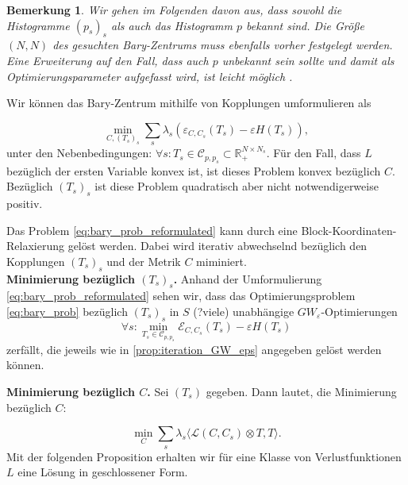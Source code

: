 \documentclass[twoside, 11pt,a4paper]{article}
\newtheorem{remark}[theorem]{Bemerkung}
\numberwithin{equation}{section}
\begin{document}
	\begin{remark}
		Wir gehen im Folgenden davon aus, dass sowohl die Histogramme $(p_s)_s$ als auch das Histogramm $p$ bekannt sind. Die Größe $(N,N)$ des gesuchten Bary-Zentrums muss ebenfalls vorher festgelegt werden.
		Eine Erweiterung auf den Fall, dass auch $p$ unbekannt sein sollte und damit als Optimierungsparameter aufgefasst wird, ist leicht möglich \cite{gwd_averaging_kernels}.
	\end{remark}
	
	Wir können das Bary-Zentrum mithilfe von Kopplungen umformulieren als
	
	\begin{equation}
	\min_{C,(T_s)_s}{\sum_s{\lambda_s(\varepsilon_{C,C_s}(T_s) - \varepsilon H(T_s))}}, \label{eq:bary_prob_reformulated} 
	\end{equation}
	unter den Nebenbedingungen: $ \forall s: T_s \in \mathcal{C}_{p,p_s} \subset \mathbb{R}_{+}^{N \times N_s}$.
	Für den Fall, dass $L$ bezüglich der ersten Variable konvex ist, ist dieses Problem konvex bezüglich $C$. Bezüglich $(T_s)_s$ ist diese Problem quadratisch aber nicht notwendigerweise positiv.
	
	Das Problem \autoref{eq:bary_prob_reformulated} kann durch eine Block-Koordinaten-Relaxierung gelöst werden. Dabei wird iterativ abwechselnd bezüglich den Kopplungen $(T_s)_s$ und der Metrik $C$ miminiert.\\
	
	\noindent \textbf{Minimierung bezüglich $(T_s)_s$.}
	Anhand der Umformulierung \autoref{eq:bary_prob_reformulated} sehen wir, dass das Optimierungsproblem \autoref{eq:bary_prob} bezüglich $(T_s)_s$ in $S$ (?viele) unabhängige $GW_\varepsilon$-Optimierungen
	\begin{equation}
	\forall s : \min_{T_s \in \mathcal{C}_{p, p_s}}{\mathcal{E}_{C,C_s}(T_s)- \varepsilon H(T_s)}
	\end{equation}
	zerfällt, die jeweils wie in \autoref{prop:iteration_GW_eps} angegeben gelöst werden können.
	
	\noindent \textbf{Minimierung bezüglich $C$.} Sei $(T_s)$ gegeben. Dann lautet, die Minimierung bezüglich $C$:
	
	\begin{equation}
	\min_C \sum_s{\lambda_s \langle \mathcal{L}(C,C_s) \otimes T,T \rangle}. \label{eq:minimierung_C}
	\end{equation}
	Mit der folgenden Proposition erhalten wir für eine Klasse von Verlustfunktionen $L$ eine Lösung in geschlossener Form.
	
\end{document}
